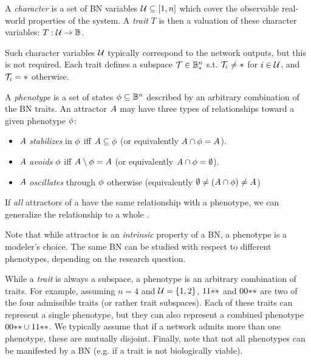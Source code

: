 \begin{definition}
	A \emph{character} is a set of BN variables $\mathcal{U} \subseteq [1,n]$ which cover the observable real-world properties of the system. A \emph{trait} $T$ is then a valuation of these character variables: $T: \mathcal{U} \to \mathbb{B}$.
\end{definition}

Such character variables $\mathcal{U}$ typically correspond to the network outputs, but this is not required. Each trait defines a subspace $\mathcal{T} \in \mathbb{B}_{{*}}^n$ s.t. $\mathcal{T}_i \neq {*}$ for $i \in \mathcal{U}$, and $\mathcal{T}_i = {*}$ otherwise. 

\begin{definition}
	A \emph{phenotype} is a set of states $\phi \subseteq \mathbb{B}^n$ described by an arbitrary combination of the BN traits. An attractor $A$ may have three types of relationships toward a given phenotype $\phi$: 
  \begin{itemize}
    \item $A$ \emph{stabilizes} in $\phi$ iff $A \subseteq \phi$ (or equivalently $A \cap \phi = A$).
    \item $A$ \emph{avoids} $\phi$ iff $A \setminus \phi = A$ (or equivalently $A \cap \phi = \emptyset$).
    \item $A$ \emph{oscillates} through $\phi$ otherwise (equivalently $\emptyset \neq ( A \cap \phi ) \neq A $)
  \end{itemize}
  
If \emph{all} attractors of a \BN{} have the same relationship with a phenotype, we can generalize the relationship to a whole \BN{}.
\end{definition}

Note that while attractor is an \emph{intrinsic} property of a BN, a phenotype is a modeler's choice. The same BN can be studied with respect to different phenotypes, depending on the research question.

While a \emph{trait} is always a subspace, a phenotype is an arbitrary combination of traits. For example, assuming $n=4$ and $\mathcal{U} = \{1,2\}$, $11{*}{*}$ and $00{*}{*}$ are two of the four admissible traits (or rather trait subspaces). Each of these traits can represent a single phenotype, but they can also represent a combined phenotype $00{*}{*} \cup 11{*}{*}$. We typically assume that if a network admits more than one phenotype, these are mutually disjoint. Finally, note that not all phenotypes can be manifested by a BN (e.g. if a trait is not biologically viable).

